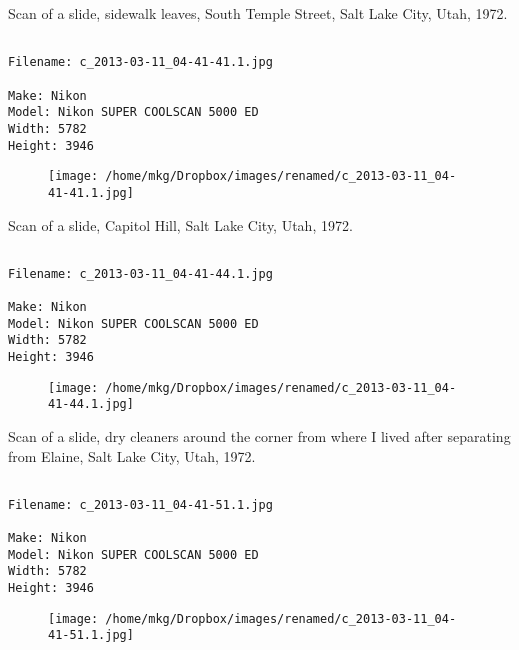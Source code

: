 \clearpage
\onecolumn
\noindent Scan of a slide, sidewalk leaves, South Temple Street, Salt Lake City, Utah, 1972.
\noindent
\begin{lstlisting}

Filename: c_2013-03-11_04-41-41.1.jpg

Make: Nikon
Model: Nikon SUPER COOLSCAN 5000 ED
Width: 5782
Height: 3946
\end{lstlisting}
\clearpage

\begin{figure}
\texttt{[image: /home/mkg/Dropbox/images/renamed/c\_2013-03-11\_04-41-41.1.jpg]}
\end{figure}
    
\clearpage
\onecolumn
\noindent Scan of a slide, Capitol Hill, Salt Lake City, Utah, 1972.
\noindent
\begin{lstlisting}

Filename: c_2013-03-11_04-41-44.1.jpg

Make: Nikon
Model: Nikon SUPER COOLSCAN 5000 ED
Width: 5782
Height: 3946
\end{lstlisting}
\clearpage

\begin{figure}
\texttt{[image: /home/mkg/Dropbox/images/renamed/c\_2013-03-11\_04-41-44.1.jpg]}
\end{figure}
    
\clearpage
\onecolumn
\noindent Scan of a slide, dry cleaners around the corner from where I lived after separating from Elaine, Salt Lake City, Utah, 1972.
\noindent
\begin{lstlisting}

Filename: c_2013-03-11_04-41-51.1.jpg

Make: Nikon
Model: Nikon SUPER COOLSCAN 5000 ED
Width: 5782
Height: 3946
\end{lstlisting}
\clearpage

\begin{figure}
\texttt{[image: /home/mkg/Dropbox/images/renamed/c\_2013-03-11\_04-41-51.1.jpg]}
\end{figure}
    
